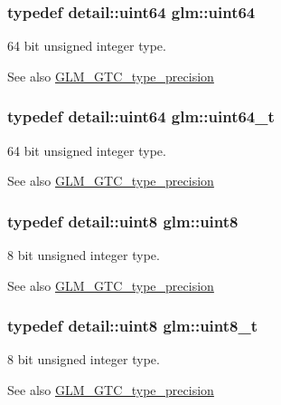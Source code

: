 \subsubsection[{uint64}]{\setlength{\rightskip}{0pt plus 5cm}typedef detail\+::uint64 {\bf glm\+::uint64}}\label{group__gtc__type__precision_gae3632bf9b37da66233d78930dd06378a}
64 bit unsigned integer type. \begin{DoxySeeAlso}{See also}
\hyperlink{group__gtc__type__precision}{G\+L\+M\+\_\+\+G\+T\+C\+\_\+type\+\_\+precision} 
\end{DoxySeeAlso}
\hypertarget{group__gtc__type__precision_ga058f57c19e1befdcf12498944bd73e69}{}
\subsubsection[{uint64\+\_\+t}]{\setlength{\rightskip}{0pt plus 5cm}typedef detail\+::uint64 {\bf glm\+::uint64\+\_\+t}}\label{group__gtc__type__precision_ga058f57c19e1befdcf12498944bd73e69}
64 bit unsigned integer type. \begin{DoxySeeAlso}{See also}
\hyperlink{group__gtc__type__precision}{G\+L\+M\+\_\+\+G\+T\+C\+\_\+type\+\_\+precision} 
\end{DoxySeeAlso}
\hypertarget{group__gtc__type__precision_ga1a7dcd8aac97cc8020817c94049deff2}{}
\subsubsection[{uint8}]{\setlength{\rightskip}{0pt plus 5cm}typedef detail\+::uint8 {\bf glm\+::uint8}}\label{group__gtc__type__precision_ga1a7dcd8aac97cc8020817c94049deff2}
8 bit unsigned integer type. \begin{DoxySeeAlso}{See also}
\hyperlink{group__gtc__type__precision}{G\+L\+M\+\_\+\+G\+T\+C\+\_\+type\+\_\+precision} 
\end{DoxySeeAlso}
\hypertarget{group__gtc__type__precision_ga93adf6dd9803408f3e3aaf9dedda352b}{}
\subsubsection[{uint8\+\_\+t}]{\setlength{\rightskip}{0pt plus 5cm}typedef detail\+::uint8 {\bf glm\+::uint8\+\_\+t}}\label{group__gtc__type__precision_ga93adf6dd9803408f3e3aaf9dedda352b}
8 bit unsigned integer type. \begin{DoxySeeAlso}{See also}
\hyperlink{group__gtc__type__precision}{G\+L\+M\+\_\+\+G\+T\+C\+\_\+type\+\_\+precision} 
\end{DoxySeeAlso}
